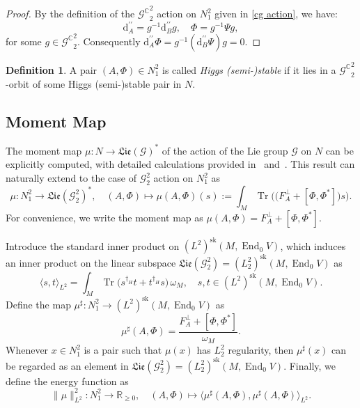\documentclass[a4paper]{amsart}
\theoremstyle{definition}
\newtheorem{definition}[theorem]{Definition}
\theoremstyle{remark}
\numberwithin{equation}{section}
\begin{document}
\begin{proof}
By the definition of the ${\mathscr{G}^\mathbb{C}}_2^2$ action on $N_1^2$ given in \eqref{cg action}, we have:
\[
\mathrm{d}_A^{\prime\prime} = g^{-1} \mathrm{d}_B^{\prime\prime} g, \quad \Phi = g^{-1} \Psi g,
\]
for some $g \in {\mathscr{G}^\mathbb{C}}_2^2$. Consequently $\mathrm{d}_A^{\prime\prime} \Phi = g^{-1} (\mathrm{d}_B^{\prime\prime} \Psi) g = 0.$
\end{proof} 

\begin{definition}\label{Hstable}
A pair $(A, \Phi) \in N_1^2$ is called \textit{Higgs (semi-)stable} if it lies in a ${\mathscr{G}^\mathbb{C}}_2^2$-orbit of some Higgs (semi-)stable pair in $N$.
\end{definition}

\subsection{Moment Map}

The moment map $\mu: N \to \mathfrak{Lie}(\mathscr{G})^*$ of the action of the Lie group $\mathscr{G}$ on $N$ can be explicitly computed, with detailed calculations provided in~\cite[Section~9]{atiyah1983yang} and~\cite[Section~4]{hitchin1987self}. This result can naturally extend to the case of $\mathscr{G}_2^2$ action on $N_1^2$ as
\begin{equation}
\mu: N_1^2 \to \mathfrak{Lie}(\mathscr{G}_2^2)^*, \quad (A, \Phi) \mapsto \mu(A, \Phi)(s) := \int_M \operatorname{Tr}\Big( \big(F_A^\perp + [\Phi, \Phi^*]\big) s \Big). \label{moment map}
\end{equation}
For convenience, we write the moment map as $\mu(A, \Phi) = F_A^\perp + [\Phi, \Phi^*]$. 

Introduce the standard  inner product on $(L^2)^{\text{sk}}(M, \operatorname{End}_0 V)$, which induces an inner product on the linear subspace $\mathfrak{Lie}(\mathscr{G}_2^2) = (L_2^2)^{\text{sk}}(M, \operatorname{End}_0 V)$ as
\[
\langle s, t \rangle_{L^2} = \int_M \operatorname{Tr}\big(s^{\dagger_H} t + t^{\dagger_H} s\big) \, \omega_M, \quad s, t \in (L^2)^{\text{sk}}(M, \operatorname{End}_0 V).
\]
Define the map $\mu^\sharp : N_1^2 \to (L^2)^{\text{sk}}(M, \operatorname{End}_0 V)$ as
\[
\mu^\sharp(A, \Phi) = \frac{F_A^\perp + [\Phi, \Phi^*]}{\omega_M}.
\]
Whenever $x \in N_1^2$ is a pair such that $\mu(x)$ has $L_2^2$ regularity, then $\mu^\sharp(x)$ can be regarded as an element in  $\mathfrak{Lie}(\mathscr{G}_2^2) = (L_2^2)^{\text{sk}}(M, \operatorname{End}_0 V)$. 
Finally, we define the energy function as
\[
\|\mu\|^2_{L^2} : N_1^2 \to \mathbb{R}_{\geq 0}, \quad (A, \Phi) \mapsto \Big\langle \mu^\sharp(A, \Phi), \mu^\sharp(A, \Phi) \Big\rangle_{L^2}.
\]
\end{document}
